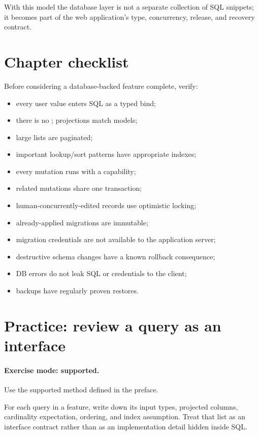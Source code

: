 With this model the database layer is not a separate collection of SQL snippets; it becomes part of the web application's type, concurrency, release, and recovery contract.

\section{Chapter checklist}

Before considering a database-backed feature complete, verify:

\begin{itemize}
\item every user value enters SQL as a typed bind;
\item there is no ; projections match models;
\item large lists are paginated;
\item important lookup/sort patterns have appropriate indexes;
\item every mutation runs with a  capability;
\item related mutations share one transaction;
\item human-concurrently-edited records use optimistic locking;
\item already-applied migrations are immutable;
\item migration credentials are not available to the application server;
\item destructive schema changes have a known rollback consequence;
\item DB errors do not leak SQL or credentials to the client;
\item backups have regularly proven restores.
\end{itemize}

\section{Practice: review a query as an interface}
\paragraph{Exercise mode: supported.} Use the supported method defined in the preface.

For each query in a feature, write down its input types, projected columns, cardinality expectation, ordering, and index assumption. Treat that list as an interface contract rather than as an implementation detail hidden inside SQL.

